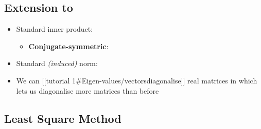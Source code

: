 \subsection*{\texorpdfstring{Extension to
    }{Extension to }}

\begin{itemize}

  \item
        Standard inner product:

        \begin{itemize}

          \item
                \textbf{Conjugate-symmetric}:
        \end{itemize}
  \item
        Standard \emph{(induced)} norm:
  \item
        We can {[}{[}tutorial
        1\#Eigen-values/vectors\textbar diagonalise{]}{]} real matrices in
         which lets us diagonalise more matrices than before
\end{itemize}

\subsection*{Least Square Method}

